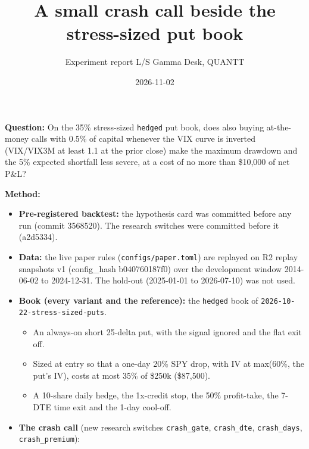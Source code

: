 \documentclass{article}
\title{A small crash call beside the stress-sized put book}
\author{Experiment report \textperiodcentered{} L/S Gamma Desk, QUANTT}
\date{2026-11-02}
\begin{document}
\maketitle

\textbf{Question:} On the 35\% stress-sized \texttt{hedged} put book, does also buying at-the-money calls with 0.5\% of capital whenever the VIX curve is inverted (VIX/\allowbreak{}VIX3M at least 1.1 at the prior close) make the maximum drawdown and the 5\% expected shortfall less severe, at a cost of no more than \$10,000 of net P\&L?

\textbf{Method:}

\begin{itemize}

\item \textbf{Pre-registered backtest:} the hypothesis card was committed before any run (commit 3568520). The research switches were committed before it (a2d5334).

\item \textbf{Data:} the live paper rules (\texttt{configs/\allowbreak{}paper.\allowbreak{}toml}) are replayed on R2 replay snapshots v1 (config\_hash b040760187f0) over the development window 2014-06-02 to 2024-12-31. The hold-out (2025-01-01 to 2026-07-10) was not used.

\item \textbf{Book (every variant and the reference):} the \texttt{hedged} book of \texttt{2026-\allowbreak{}10-\allowbreak{}22-\allowbreak{}stress-\allowbreak{}sized-\allowbreak{}puts}.

\begin{itemize}

\item An always-on short 25-delta put, with the signal ignored and the flat exit off.

\item Sized at entry so that a one-day 20\% SPY drop, with IV at max(60\%, the put's IV), costs at most 35\% of \$250k (\$87,500).

\item A 10-share daily hedge, the 1x-credit stop, the 50\% profit-take, the 7-DTE time exit and the 1-day cool-off.

\end{itemize}

\item \textbf{The crash call} (new research switches \texttt{crash\_\allowbreak{}gate}, \texttt{crash\_\allowbreak{}dte}, \texttt{crash\_\allowbreak{}days}, \texttt{crash\_\allowbreak{}premium}):


\end{itemize}
\end{document}
